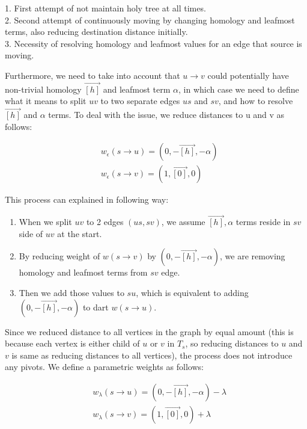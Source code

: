 \documentclass{article}
\begin{document}
\begin{center}
{\color{red}
1. First attempt of not maintain holy tree at all times.
\\
2. Second attempt of continuously moving by changing homology and 
leafmost terms, also reducing destination distance initially.
\\ 
3. Necessity of resolving homology and leafmost values for an edge 
that source is moving.}
\end{center}

Furthermore, we need to take into account that $u \rightarrow v$ could potentially have non-trivial homology $\vec{[h]}$ and leafmost term $\alpha$, in which case we need to define what it means to split $uv$ to two separate edges $us$ and $sv$, and how to resolve $\vec{[h]}$ and $\alpha$ terms. To deal with the issue, we reduce distances to u and v as follows:

\begin{align}
& w_{\epsilon}(s \rightarrow u) = ( 0, -\vec{[h]}, -\alpha ) \\ 
& w_{\epsilon}(s \rightarrow v) = ( 1, \vec{[0]}, 0 )
\end{align}

This process can explained in following way: 
\begin{enumerate}
\item When we split $uv$ to 2 edges $(us, sv)$, we assume $\vec{[h]}, \alpha$ terms reside in $sv$ side of $uv$ at the start.
\item By reducing weight of $w(s \rightarrow v) $ by $( 0, -\vec{[h]}, -\alpha )$, we are removing homology and leafmost terms from $sv$ edge.
\item Then we add those values to $su$, which is equivalent to adding  $( 0, -\vec{[h]}, -\alpha )$ to dart $w(s \rightarrow u) $.
\end{enumerate}

Since we reduced distance to all vertices in the graph by equal amount (this is because each vertex is either child of $u$ or $v$ in $T_s$, so reducing distances to $u$ and $v$ is same as reducing distances to all vertices), the process does
not introduce any pivots. We define a parametric weights as follows:

\begin{align}
& w_{\lambda}(s \rightarrow u) = ( 0, -\vec{[h]}, -\alpha ) - \lambda \\
& w_{\lambda}(s \rightarrow v) = ( 1, \vec{[0]}, 0 )  + \lambda 
\end{align}
\end{document}
